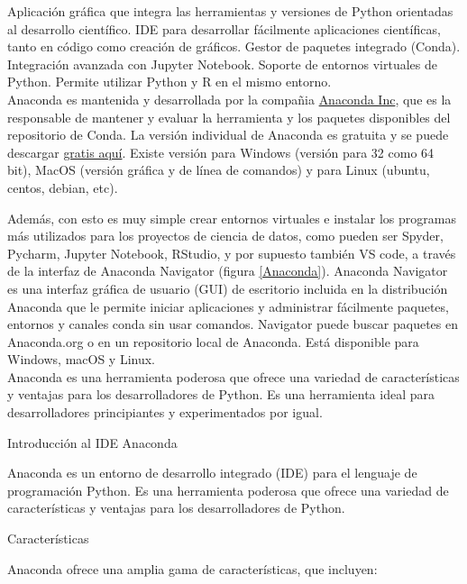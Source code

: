 Aplicación gráfica que integra las herramientas y versiones de Python orientadas al desarrollo científico. 
IDE para desarrollar fácilmente aplicaciones científicas, tanto en código como creación de gráficos. 
Gestor de paquetes integrado (Conda).  Integración avanzada con Jupyter Notebook. Soporte de entornos virtuales de Python.
Permite utilizar Python y R en el mismo entorno.\\


Anaconda es mantenida y desarrollada por la compañia \href{https://www.anaconda.com}{\color{vino} Anaconda Inc}, que es la responsable de mantener y evaluar la herramienta y los paquetes disponibles del repositorio de Conda. La versión individual de Anaconda es gratuita y se puede descargar \href{https://www.anaconda.com/download}{\color{vino} gratis aquí}. Existe versión para Windows (versión para 32 como 64 bit), MacOS (versión gráfica y de línea de comandos) y para Linux (ubuntu, centos, debian, etc). 

Además, con esto es muy simple crear entornos virtuales e instalar los programas más utilizados para los proyectos de ciencia de datos, como pueden ser Spyder, Pycharm,  Jupyter Notebook, RStudio, y por supuesto también VS code,  a través de la interfaz de Anaconda Navigator (figura \ref{Anaconda}).  Anaconda Navigator es una interfaz gráfica de usuario (GUI) de escritorio incluida en la distribución Anaconda que le permite iniciar aplicaciones y administrar fácilmente paquetes, entornos y canales conda sin usar comandos.
Navigator puede buscar paquetes en Anaconda.org o en un repositorio local de Anaconda. Está disponible para Windows, macOS y Linux.\\

Anaconda es una herramienta poderosa que ofrece una variedad de características y ventajas para los desarrolladores de Python. Es una herramienta ideal para desarrolladores principiantes y experimentados por igual.


Introducción al IDE Anaconda

Anaconda es un entorno de desarrollo integrado (IDE) para el lenguaje de programación Python. Es una herramienta poderosa que ofrece una variedad de características y ventajas para los desarrolladores de Python.

Características

Anaconda ofrece una amplia gama de características, que incluyen:

